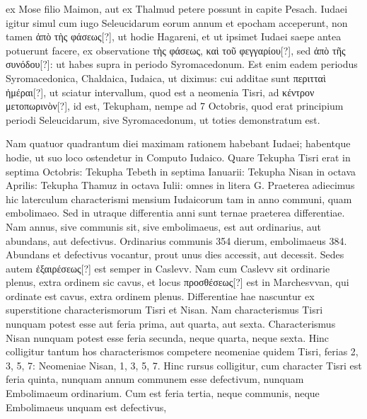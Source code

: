 ex Mose filio Maimon, aut ex Thalmud petere possunt in capite Pesach.
%
Iudaei igitur simul cum iugo
 Seleucidarum eorum annum et epocham
acceperunt, non tamen \textgreek{ἀπὸ τὴς φάσεως[?]},
 ut hodie Hagareni, et ut ipsimet
Iudaei saepe antea potuerunt facere, ex observatione
 \textgreek{τὴς φάσεως, καὶ τοῦ φεγγαρίου[?]},
sed \textgreek{ἀπὸ τῆς συνόδου[?]}: ut habes supra in periodo Syromacedonum.
Est enim eadem periodus Syromacedonica, Chaldaica, Iudaica, ut diximus:
cui additae sunt \textgreek{περιτταὶ ἡμέραι[?]}, ut sciatur intervallum, quod est
a neomenia Tisri, ad \textgreek{κέντρον μετοπωρινὸν[?]},
 id est, Tekupham, nempe ad 7
Octobris, quod erat principium periodi Seleucidarum, sive Syromacedonum,
ut toties demonstratum
est.
%
\begin{table}[t]
  \centering
  
\end{table}
%
Nam quatuor quadrantum
diei maximam rationem
habebant Iudaei; habentque
hodie, ut suo loco ostendetur
in Computo Iudaico.
Quare Tekupha Tisri erat in
septima Octobris: Tekupha
Tebeth in septima Ianuarii:
Tekupha Nisan in octava Aprilis:
Tekupha Thamuz in octava
Iulii: omnes in litera G.
Praeterea adiecimus hic laterculum
characterismi mensium
Iudaicorum tam in anno communi,
quam embolimaeo.
Sed in utraque differentia anni sunt ternae
praeterea differentiae.
Nam annus, sive communis sit, sive embolimaeus,
est aut ordinarius, aut abundans, aut defectivus.
Ordinarius communis
354 dierum, embolimaeus 384.
Abundans et defectivus vocantur,
prout unus dies accessit, aut decessit.
Sedes autem \textgreek{ἐξαιρέσεως[?]} est semper
in Caslevv.
Nam cum Caslevv sit ordinarie plenus, extra ordinem sic
cavus, et locus \textgreek{προσθέσεως[?]} est in Marchesvvan,
 qui ordinate est cavus,
extra ordinem plenus.
Differentiae hae nascuntur ex superstitione characterismorum
Tisri et Nisan.
Nam characterismus Tisri nunquam
potest esse aut feria prima, aut quarta, aut sexta.
Characterismus Nisan
nunquam potest esse feria secunda, neque quarta, neque sexta.
Hinc
colligitur tantum hos characterismos competere neomeniae quidem
Tisri, ferias 2, 3, 5, 7: Neomeniae Nisan, 1, 3, 5, 7.
Hinc rursus colligitur,
cum character Tisri est feria quinta, nunquam annum communem
esse defectivum, nunquam Embolimaeum ordinarium.
Cum est feria
tertia, neque communis, neque Embolimaeus unquam est defectivus,
